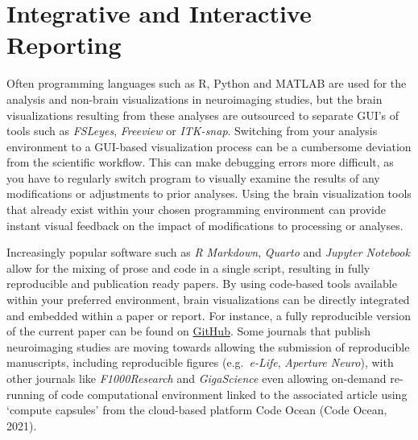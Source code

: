 \documentclass{article}
\begin{document}
\hypertarget{integrative-and-interactive-reporting}{%
\section{Integrative and Interactive Reporting}\label{integrative-and-interactive-reporting}}

Often programming languages such as R, Python and MATLAB are used for the analysis and non-brain visualizations in neuroimaging studies, but the brain visualizations resulting from these analyses are outsourced to separate GUI's of tools such as \emph{FSLeyes}, \emph{Freeview} or \emph{ITK-snap}. Switching from your analysis environment to a GUI-based visualization process can be a cumbersome deviation from the scientific workflow. This can make debugging errors more difficult, as you have to regularly switch program to visually examine the results of any modifications or adjustments to prior analyses. Using the brain visualization tools that already exist within your chosen programming environment can provide instant visual feedback on the impact of modifications to processing or analyses.

Increasingly popular software such as \emph{R Markdown}, \emph{Quarto} and \emph{Jupyter Notebook} allow for the mixing of prose and code in a single script, resulting in fully reproducible and publication ready papers. By using code-based tools available within your preferred environment, brain visualizations can be directly integrated and embedded within a paper or report. For instance, a fully reproducible version of the current paper can be found on \href{https://github.com/sidchop/Brain_comms_field_potential}{GitHub}. Some journals that publish neuroimaging studies are moving towards allowing the submission of reproducible manuscripts, including reproducible figures (e.g.~\emph{e-Life}, \emph{Aperture Neuro}), with other journals like \emph{F1000Research} and \emph{GigaScience} even allowing on-demand re-running of code computational environment linked to the associated article using `compute capsules' from the cloud-based platform Code Ocean (Code Ocean, 2021).
\end{document}
